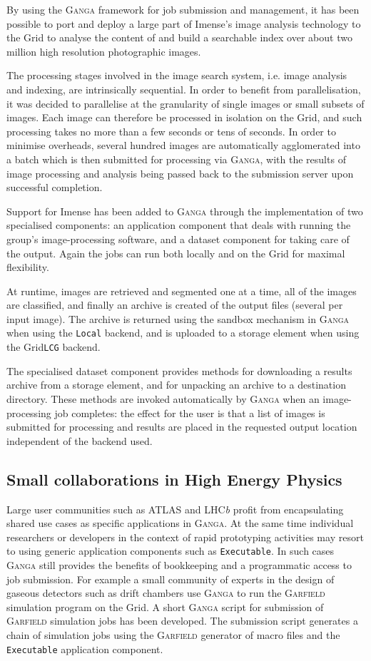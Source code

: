 \documentclass{elsart}
\def\lhcb {LHC{\em b\/}\xspace}
\def\atlas {ATLAS\xspace}
\def\ganga {\textsc{Ganga}\xspace}
\def\garfield {\textsc{Garfield}\xspace}
\def\grid {Grid\xspace}
\newcommand{\code}[1]{\texttt{#1}}
\begin{document}
By using the \ganga framework for job submission and management, it has been
possible to port and deploy a large part of Imense's image analysis technology
to the \grid to analyse the content of and build a searchable index over about
two million high resolution photographic images.

The processing stages involved in the image search system, i.e. image analysis
and indexing, are intrinsically sequential. In order to benefit from
parallelisation, it was decided to parallelise at the granularity of single
images or small subsets of images. Each image can therefore be processed in
isolation on the \grid, and such processing takes no more than a few seconds
or tens of seconds. In order to minimise overheads, several hundred images are
automatically agglomerated into a batch which is then submitted for processing
via \ganga, with the results of image processing and analysis being passed
back to the submission server upon successful completion.

Support for Imense has been added to \ganga through the implementation of two
specialised components: an application component that deals with running the
group's image-processing software, and a dataset component for taking care of
the output. Again the jobs can run both locally and on the \grid for maximal
flexibility.

At runtime, images are retrieved and segmented one at a time, all of the
images are classified, and finally an archive is created of the output files
(several per input image).  The archive is returned using the sandbox
mechanism in \ganga when using the \code{Local} backend, and is uploaded to a
storage element when using the \grid \code{LCG} backend.

The specialised dataset component provides methods for downloading a results
archive from a storage element, and for unpacking an archive to a destination
directory. These methods are invoked automatically by \ganga when an
image-processing job completes: the effect for the user is that a list of
images is submitted for processing and results are placed in the requested
output location independent of the backend used.

\subsection{Small collaborations in High Energy Physics}
\label{sec:smallHEP}
Large user communities such as \atlas and \lhcb profit from encapsulating
shared use cases as specific applications in \ganga. At the same time
individual researchers or developers in the context of rapid prototyping
activities may resort to using generic application components such as
\code{Executable}. In such cases \ganga still provides the benefits of
bookkeeping and a programmatic access to job submission. For example a small
community of experts in the design of gaseous detectors such as drift chambers
use \ganga to run the \garfield~\cite{Garfield} simulation program on the
\grid.  A short \ganga script for submission of \garfield simulation jobs has
been developed. The submission script generates a chain of simulation jobs
using the \garfield generator of macro files and the \code{Executable}
application component.
\end{document}
